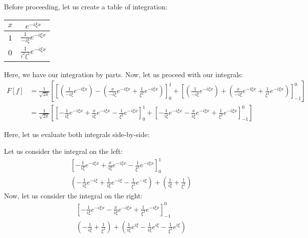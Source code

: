 \begin{enumerate}
Before proceeding, let us create a table of integration:

\begin{center}
  \begin{tabular}{c|c}
    $x$ &  $                    e^{-i \xi x}$\\
    \hline
    $1$ &  $\frac{1}{-i \xi}    e^{-i \xi x}$\\
    \hline
    $0$ &  $\frac{1}{i^2 \xi^2} e^{-i \xi x}$
  \end{tabular}
\end{center}

Here, we have our integration by parts. Now, let us proceed with our integrals:
%
\begin{align}
  F[f]
  & =
  \frac{1}{\sqrt{2 \pi}}
  \left[
    \left[
       \left(\frac{1}{-i \xi} e^{-i \xi x}\right)
     - \left(\frac{x}{- i \xi} e^{-i \xi x} + \frac{1}{\xi^2} e^{-i \xi x}\right)
    \right]^1_0
  + \left[
      \left(\frac{1}{-i \xi} e^{-i \xi x}\right)
    + \left(\frac{x}{- i \xi} e^{-i \xi x} + \frac{1}{\xi^2} e^{-i \xi x}\right)
    \right]^0_{-1}
  \right]\\
  & =
  \frac{1}{\sqrt{2 \pi}}
  \left[
    \left[
     - \frac{1}{ i \xi} e^{-i \xi x}
     + \frac{x}{ i \xi} e^{-i \xi x}
     - \frac{1}{ \xi^2} e^{-i \xi x}
    \right]^1_0
  + \left[
    - \frac{1}{ i \xi} e^{-i \xi x}
    - \frac{x}{ i \xi} e^{-i \xi x}
    + \frac{1}{ \xi^2} e^{-i \xi x}
    \right]^0_{-1}
  \right]
\end{align}

Here, let us evaluate both integrals side-by-side:
\bigbreak
\begin{multicols}{2}
  Let us consider the integral on the left:
\begin{align}
  &
  \left[
    - \frac{1}{ i \xi} e^{-i \xi x}
    + \frac{x}{ i \xi} e^{-i \xi x}
    - \frac{1}{ \xi^2} e^{-i \xi x}
  \right]^1_0\\
  &
  \left(
    - \frac{1}{ i \xi} e^{-i \xi}
    + \frac{1}{ i \xi} e^{-i \xi}
    - \frac{1}{ \xi^2} e^{-i \xi}
  \right)
  +
  \left(
    \frac{1}{ i \xi}
  + \frac{1}{ \xi^2}
  \right)
\end{align}
  Now, let us consider the integral on the right:
\begin{align}
  &
  \left[
  - \frac{1}{ i \xi} e^{-i \xi x}
  - \frac{x}{ i \xi} e^{-i \xi x}
  + \frac{1}{ \xi^2} e^{-i \xi x}
  \right]^0_{-1}\\
  &
  \left(
  - \frac{1}{ i \xi}
  + \frac{1}{ \xi^2}
  \right)
  +
  \left(
    \frac{1}{ i \xi} e^{i \xi}
  - \frac{1}{ i \xi} e^{i \xi}
  - \frac{1}{ \xi^2} e^{i \xi}
  \right)
\end{align}
\end{multicols}


\end{enumerate}
